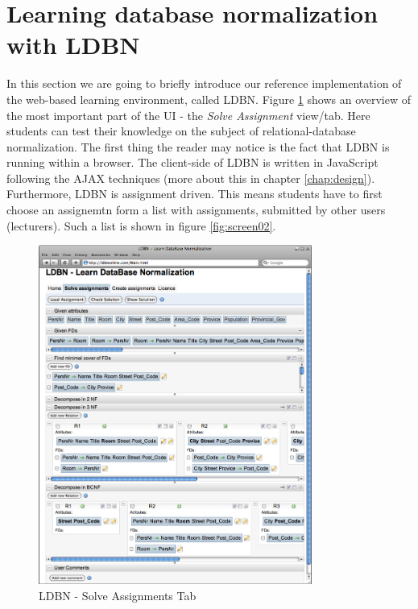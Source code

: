 \section{Learning database normalization with LDBN}
\label{sec:introldbn}
In this section we are going to briefly introduce our reference implementation
of the web-based learning environment, called LDBN.    
Figure \ref{fig:screen01} shows an overview of the most important part of the UI - 
the \textit{Solve Assignment} view/tab. Here students can test their knowledge on 
the subject of relational-database normalization. The first thing the reader 
may notice is the fact that LDBN is running within a browser. The client-side 
of LDBN is written in JavaScript following the AJAX techniques 
(more about this in chapter \ref{chap:design}). 
Furthermore, LDBN is assignment driven. This means students have to first 
choose an assignemtn 
form a list with assignments, submitted by other users (lecturers). 
Such a list is shown in figure \ref{fig:screen02}.

\begin{figure}[h]
	\begin{center}
		\includegraphics[width=0.8\textwidth]{./img/screen01b.png}
		\caption{LDBN - Solve Assignments Tab}
		\label{fig:screen01}
	\end{center}
\end{figure}

